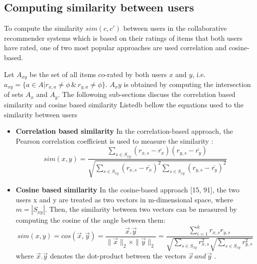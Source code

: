 \subsection{Computing similarity between users}
To compute the similarity $sim(c,c')$ between users in the collaborative recommender systems which is based on their ratings of items that both users have rated, one of two most popular approaches are used correlation and cosine-based. 

Let $A_{xy}$ be the set of all items co-rated by both users $x$ and $y$, i.e. $a_{xy}=\{a\in A|r_{x,a}\neq \phi\, \&\, r_{y,a} \neq \phi \}$. $A_xy$ is obtained by computing the intersection of sets $A_x$ and $A_y$.
The followoing sub-sections discuss the correlation based similarity and cosine based similarity
Listedb bellow the equations used to the similarity between users
\begin{itemize}
\item \textbf{Correlation based similarity}
In the correlation-based approach, the Pearson correlation coefficient is used to measure the similarity \citep{recom_86} \citep{recom_97}:
\begin{equation}\label{eq:12}
sim(x,y)= \frac {\sum_{s\in S_{xy}}(r_{x,s}-\bar{r_x})(r_{y,s}- \bar{r_y})}{\sqrt{\sum_{s \in S_{xy}}(r_{x,s}-\bar{r_x})^2 \sum_{s\in S_{xy}}(r_{y,s}- \bar{r_y})^2}}
\end{equation}

\item \textbf{Cosine based similarity}
In the cosine-based approach [15, 91], the two users x and y are treated as two vectors in m-dimensional space, where $m=|S_{xy} |$. Then, the similarity between two vectors can be measured by computing the cosine of the angle between them:
\begin{equation}\label{eq:13}
sim(x,y)= cos(\vec{x}  ,\vec {y}) = \frac{\vec{x} . \vec {y}} {\|\vec{x}\|_2 \times \|\vec{y}\|_2 } = 
\frac{\sum _{i=1}^{k}r_{x,s}r_{y,s} }{\sqrt {\sum_{s\in S_{xy}}r^{2}_{x,s}}{\sqrt {\sum_{s\in S_{xy}}r^{2}_{y,s}}}}
\end{equation}
where $\vec{x} . \vec {y}$  denotes the dot-product between the vectors $\vec{x} \,and \,\vec {y}$ .
\end{itemize}


